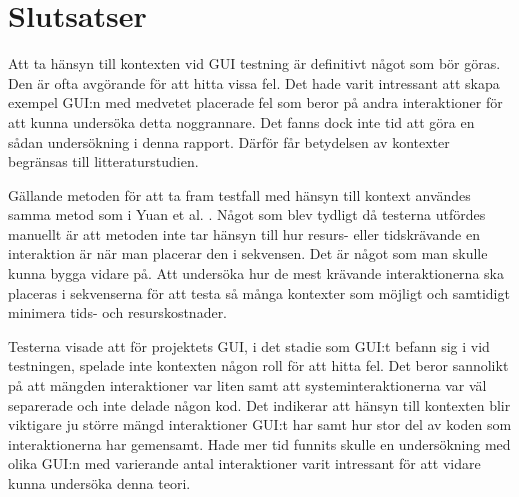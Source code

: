\section{Slutsatser}
\label{sec:conclusions-holmberg}

Att ta hänsyn till kontexten vid GUI testning är definitivt något som bör göras. Den är ofta avgörande för att hitta vissa fel. Det hade varit intressant att skapa exempel GUI:n med medvetet placerade fel som beror på andra interaktioner för att kunna undersöka detta noggrannare. Det fanns dock inte tid att göra en sådan undersökning i denna rapport. Därför får betydelsen av kontexter begränsas till litteraturstudien.

Gällande metoden för att ta fram testfall med hänsyn till kontext användes samma metod som i Yuan et al. \cite{yuan2011gui}. Något som blev tydligt då testerna utfördes manuellt är att metoden inte tar hänsyn till hur resurs- eller tidskrävande en interaktion är när man placerar den i sekvensen. Det är något som man skulle kunna bygga vidare på. Att undersöka hur de mest krävande interaktionerna ska placeras i sekvenserna för att testa så många kontexter som möjligt och samtidigt minimera tids- och resurskostnader.

Testerna visade att för projektets GUI, i det stadie som GUI:t befann sig i vid testningen, spelade inte kontexten någon roll för att hitta fel. Det beror sannolikt på att mängden interaktioner var liten samt att systeminteraktionerna var väl separerade och inte delade någon kod. Det indikerar att hänsyn till kontexten blir viktigare ju större mängd interaktioner GUI:t har samt hur stor del av koden som interaktionerna har gemensamt. Hade mer tid funnits skulle en undersökning med olika GUI:n med varierande antal interaktioner varit intressant för att vidare kunna undersöka denna teori.

